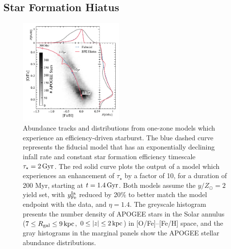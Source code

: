 \documentclass[twocolumn,twocolappendix,linenumbers]{aastex631}
\newcommand{\yZ}[1]{$y/Z_\odot=#1$}
\newcommand{\kpc}{\,{\rm kpc}}
\newcommand{\onecolumn}{0.47\textwidth}
\begin{document}
\subsection{Star Formation Hiatus}
\label{sec:sfe-hiatus}

\begin{figure}
    \centering
    \includegraphics[width=\onecolumn]{figures/onezone_sfe_hiatus.pdf}
    \caption{Abundance tracks and distributions from one-zone models which experience an efficiency-driven starburst. The blue dashed curve represents the fiducial model that has an exponentially declining infall rate and constant star formation efficiency timescale $\tau_\star=2\,{\rm Gyr}$. The red solid curve plots the output of a model which experiences an enhancement of $\tau_\star$ by a factor of 10, for a duration of 200 Myr, starting at $t=1.4\,{\rm Gyr}$. Both models assume the \yZ{2} yield set, with $y_{\rm Fe}^{\rm Ia}$ reduced by 20\% to better match the model endpoint with the data, and $\eta=1.4$. The greyscale histogram presents the number density of APOGEE stars in the Solar annulus ($7\leq R_{\rm gal}\leq 9\kpc$, $0\leq|z|\leq2\kpc$) in [O/Fe]--[Fe/H] space, and the gray histograms in the marginal panels show the APOGEE stellar abundance distributions.}
    \label{fig:onezone-sfe-hiatus}
\end{figure}
\end{document}
